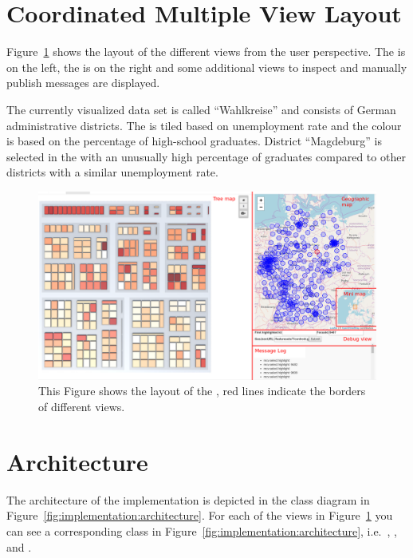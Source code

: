 \section{Coordinated Multiple View Layout}

Figure~\ref{fig:implementation:layout} shows the layout of the different views from the user perspective.
The \tmap{} is on the left, the \gv{} is on the right and some additional views to inspect and manually publish messages are displayed.

The currently visualized data set is called ``Wahlkreise'' and consists of German administrative districts.
The \tmap{} is tiled based on unemployment rate and the colour is based on the percentage of high-school graduates.
District ``Magdeburg'' is selected in the \gv{} with an unusually high percentage of graduates compared to other districts with a similar unemployment rate.

\begin{figure}[ht]
  \centering
  \caption{%
    This Figure shows the layout of the \cmv{}, red lines indicate the borders of different views.
  }\label{fig:implementation:layout}
  \includegraphics[width=\textwidth]{figures/implementation/Layout}
\end{figure}


\section{Architecture}
The architecture of the implementation is depicted in the class diagram in Figure~\ref{fig:implementation:architecture}.
For each of the views in Figure~\ref{fig:implementation:layout} you can see a corresponding class in Figure~\ref{fig:implementation:architecture}, i.e.\ , ,  and .

